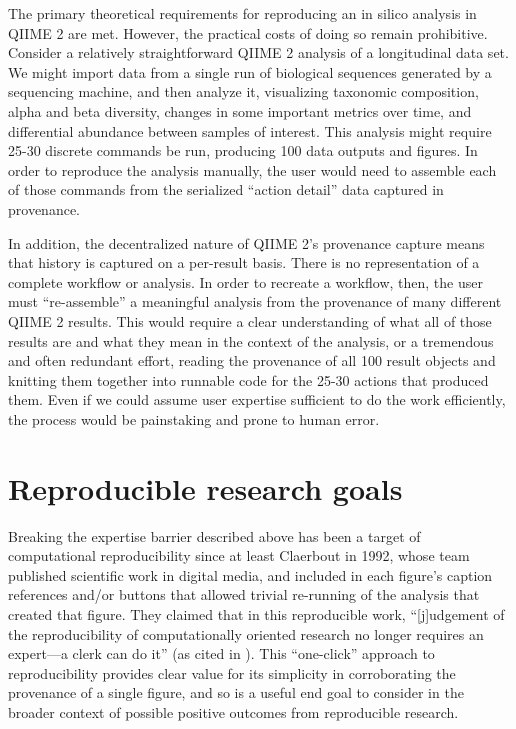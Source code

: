 The primary theoretical requirements for reproducing an in silico analysis in
QIIME 2 are met. However, the practical costs of doing so remain prohibitive.
Consider a relatively straightforward QIIME 2 analysis of a longitudinal data
set. We might import data from a single run of biological sequences generated by
a sequencing machine, and then analyze it, visualizing taxonomic composition,
alpha and beta diversity, changes in some important metrics over time, and
differential abundance between samples of interest. This analysis might require
25-30 discrete commands be run, producing 100 data outputs and figures. In order
to reproduce the analysis manually, the user would need to assemble each of
those commands from the serialized “action detail” data captured in provenance. 

In addition, the decentralized nature of QIIME 2’s provenance capture means that
history is captured on a per-result basis. There is no representation of a
complete workflow or analysis. In order to recreate a workflow, then, the user
must “re-assemble” a meaningful analysis from the provenance of many different
QIIME 2 results. This would require a clear understanding of what all of those
results are and what they mean in the context of the analysis, or a tremendous
and often redundant effort, reading the provenance of all 100 result objects and
knitting them together into runnable code for the 25-30 actions that produced
them. Even if we could assume user expertise sufficient to do the work
efficiently, the process would be painstaking and prone to human error. 

\section{Reproducible research goals}

Breaking the expertise barrier described above has been a target of
computational reproducibility since at least Claerbout in 1992, whose team
published scientific work in digital media, and included in each figure’s
caption references and/or buttons that allowed trivial re-running of the
analysis that created that figure. They claimed that in this reproducible work,
“[j]udgement of the reproducibility of computationally oriented research no
longer requires an expert—a clerk can do it” (as cited in \cite[76]{plesser_reproducibility_2018}).
This “one-click” approach to reproducibility provides clear value for its
simplicity in corroborating the provenance of a single figure, and so is a
useful end goal to consider in the broader context of possible positive outcomes
from reproducible research.


